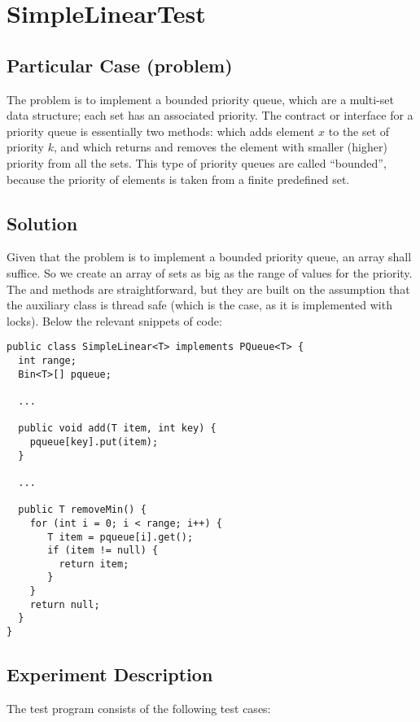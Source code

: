 \section{\textbf{SimpleLinearTest}}

\subsection{Particular Case (problem)}
The problem is to implement a bounded priority queue, which are a
multi-set data structure; each set has an associated priority. The
contract or interface for a priority queue is essentially two methods:
 which adds element $x$ to the set of priority $k$, and
   which returns and removes the element with smaller
  (higher) priority from all the sets. This type of priority queues
  are called ``bounded'', because the priority of elements is taken from
  a finite predefined set. 

\subsection{Solution}
Given that the problem is to implement a bounded priority queue, an
array shall suffice. So we create an array of sets as big as the range
of values for the priority. The  and  methods are
straightforward, but they are built on the assumption that the
auxiliary class  is thread safe (which is the case, as it is
implemented with locks). Below the relevant snippets of code: \\

\begin{lstlisting}[style=numbers]
public class SimpleLinear<T> implements PQueue<T> { 
  int range;
  Bin<T>[] pqueue; 

  ...
  
  public void add(T item, int key) {
    pqueue[key].put(item);
  }

  ... 
  
  public T removeMin() {
    for (int i = 0; i < range; i++) { 
       T item = pqueue[i].get();
       if (item != null) {
         return item;
       }
    }
    return null; 
  }
}
\end{lstlisting}
\hfill

\subsection{Experiment Description}
The test program consists of the following test cases: \\


